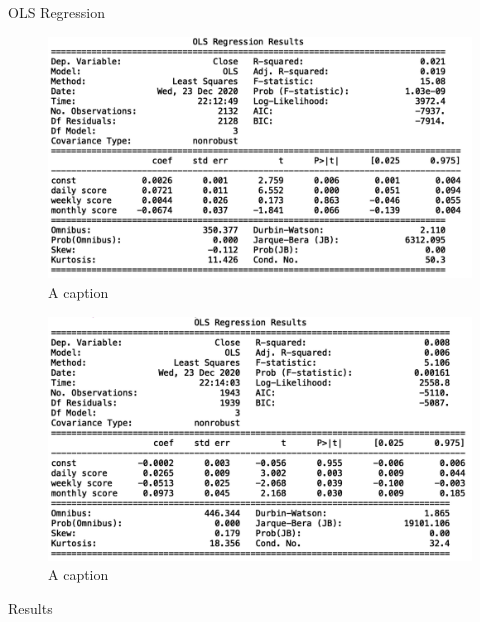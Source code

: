 \documentclass[
  ignorenonframetext,
]{beamer}
\begin{document}
\begin{frame}{OLS Regression}
\protect\hypertarget{ols-regression}{}

\begin{figure}
\includegraphics[width=1\linewidth]{btc_ols} \caption{A caption}\label{fig:pressure-1}
\end{figure}
\begin{figure}
\includegraphics[width=1\linewidth]{eth_ols} \caption{A caption}\label{fig:pressure-2}
\end{figure}

\end{frame}

\begin{frame}{Results}
\protect\hypertarget{results}{}

\end{frame}
\end{document}
